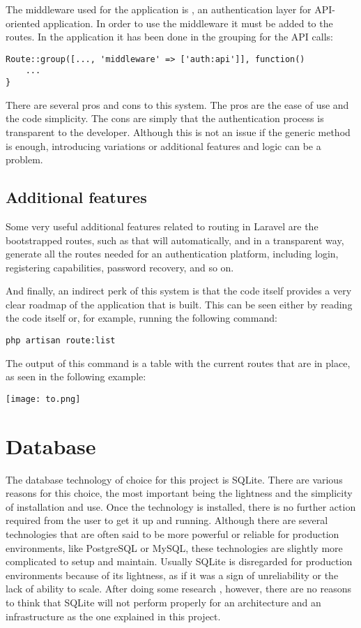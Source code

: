 The middleware used for the application is , an authentication layer for API-oriented application. In order to use the middleware it must be added to the routes. In the application it has been done in the grouping for the API calls:

\begin{verbatim}
Route::group([..., 'middleware' => ['auth:api']], function()
	...
}
\end{verbatim}

There are several pros and cons to this system. The pros are the ease of use and the code simplicity. The cons are simply that the authentication process is transparent to the developer. Although this is not an issue if the generic method is enough, introducing variations or additional features and logic can be a problem.

\subsection{Additional features}
Some very useful additional features related to routing in Laravel are the bootstrapped routes, such as  that will automatically, and in a transparent way, generate all the routes needed for an authentication platform, including login, registering capabilities, password recovery, and so on.

And finally, an indirect perk of this system is that the code itself provides a very clear roadmap of the application that is built. This can be seen either by reading the code itself or, for example, running the following command:

\begin{verbatim}
php artisan route:list
\end{verbatim}

The output of this command is a table with the current routes that are in place, as seen in the following example:

\texttt{[image: to.png]}

\section{Database}
The database technology of choice for this project is SQLite. There are various reasons for this choice, the most important being the lightness and the simplicity of installation and use. Once the technology is installed, there is no further action required from the user to get it up and running. Although there are several technologies that are often said to be more powerful or reliable for production environments, like PostgreSQL or MySQL, these technologies are slightly more complicated to setup and maintain. Usually SQLite is disregarded for production environments because of its lightness, as if it was a sign of unreliability or the lack of ability to scale. After doing some research \cite{12}, however, there are no reasons to think that SQLite will not perform properly for an architecture and an infrastructure as the one explained in this project.

